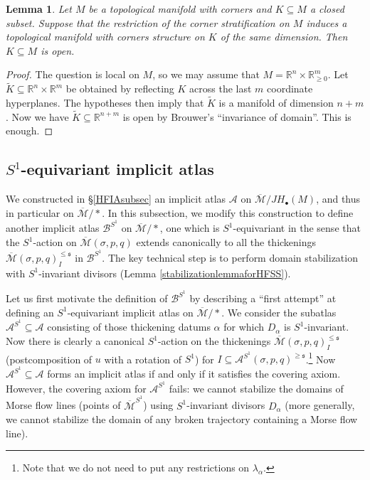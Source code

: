 \documentclass[12pt]{article}
\newtheorem{lemma}[theorem]{Lemma}
\theoremstyle{definition}
\theoremstyle{remark}
\numberwithin{equation}{subsection}
\newcommand{\s}{\mathfrak s}
\newcommand{\RR}{\mathbb R}
\newcommand{\A}{\mathcal A}
\newcommand{\B}{\mathcal B}
\newcommand{\Mbar}{\overline{\mathcal M}}
\newcommand{\JH}{J\!H}
\begin{document}
\begin{lemma}\label{cornersinvarianceofdomain}
Let $M$ be a topological manifold with corners and $K\subseteq M$ a closed subset.  Suppose that the restriction of the corner stratification on $M$ induces a topological manifold with corners structure on $K$ of the same dimension.  Then $K\subseteq M$ is open.
\end{lemma}

\begin{proof}
The question is local on $M$, so we may assume that $M=\RR^n\times\RR_{\geq 0}^m$.  Let $\tilde K\subseteq\RR^n\times\RR^m$ be obtained by reflecting $K$ across the last $m$ coordinate hyperplanes.  The hypotheses then imply that $\tilde K$ is a manifold of dimension $n+m$.  Now we have $\tilde K\subseteq\RR^{n+m}$ is open by Brouwer's ``invariance of domain''.  This is enough.
\end{proof}

\subsection{\texorpdfstring{$S^1$}{S{\textasciicircum}1}-equivariant implicit atlas}\label{SSequivariantFloeratlassec}

We constructed in \S\ref{HFIAsubsec} an implicit atlas $\A$ on $\Mbar/\JH_\bullet(M)$, and thus in particular on $\Mbar/\ast$.  In this subsection, we modify this construction to define another implicit atlas $\B^{S^1}$ on $\Mbar/\ast$, one which is $S^1$-equivariant in the sense that the $S^1$-action on $\Mbar(\sigma,p,q)$ extends canonically to all the thickenings $\Mbar(\sigma,p,q)^{\leq\s}_I$ in $\B^{S^1}$.  The key technical step is to perform domain stabilization with $S^1$-invariant divisors (Lemma \ref{stabilizationlemmaforHFSS}).

Let us first motivate the definition of $\B^{S^1}$ by describing a ``first attempt'' at defining an $S^1$-equivariant implicit atlas on $\Mbar/\ast$.  We consider the subatlas $\A^{S^1}\subseteq\A$ consisting of those thickening datums $\alpha$ for which $D_\alpha$ is $S^1$-invariant.  Now there is clearly a canonical $S^1$-action on the thickenings $\Mbar(\sigma,p,q)^{\leq\s}_I$ (postcomposition of $u$ with a rotation of $S^1$) for $I\subseteq\A^{S^1}(\sigma,p,q)^{\geq\s}$.\footnote{Note that we do not need to put any restrictions on $\lambda_\alpha$.}  Now $\A^{S^1}\subseteq\A$ forms an implicit atlas if and only if it satisfies the covering axiom.  However, the covering axiom for $\A^{S^1}$ fails: we cannot stabilize the domains of Morse flow lines (points of $\Mbar^{S^1}$) using $S^1$-invariant divisors $D_\alpha$ (more generally, we cannot stabilize the domain of any broken trajectory containing a Morse flow line).
\end{document}
